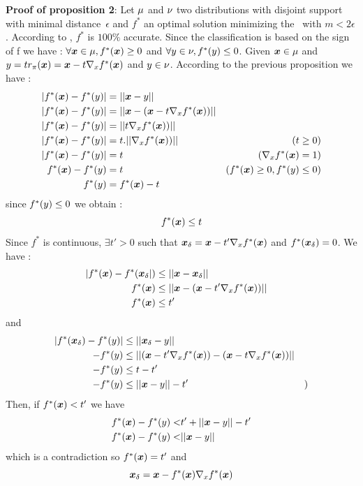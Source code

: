 \textbf{Proof of proposition 2}:
Let $\mu$ and $\nu$ two distributions with disjoint support with minimal distance~$\epsilon$ and  $f^*$ an optimal solution minimizing the \losshkr~with $m<2\epsilon$. According to \cite{serrurier2021achieving}, $f^*$ is $100\%$ accurate. Since the classification is based on the sign of f we have : $\forall \bm{x} \in \mu, f^*(\bm{x}) \geq 0$ and $\forall y \in \nu, f^*(y) \leq 0$. Given $\bm{x} \in \mu$ and $y = tr_\pi(\bm{x}) = \bm{x}  -t \nabla_x f^*(\bm{x})$  and $y \in  \nu$. According to the previous proposition we have :
\begin{align*}
  |f^*(\bm{x}) - f^*(y)| & =||\bm{x} -y || & \\
 |f^*(\bm{x}) - f^*(y)| & =||\bm{x} -(\bm{x}  -t \nabla_x f^*(\bm{x}) ) || &\\
 |f^*(\bm{x}) - f^*(y)| & =||t \nabla_x f^*(\bm{x}) ) || &\\
 |f^*(\bm{x}) - f^*(y)| & =t.|| \nabla_x f^*(\bm{x}) ) || & (t\geq 0)\\
 |f^*(\bm{x}) - f^*(y)| & =t & (\nabla_x f^*(\bm{x}) = 1)\\
 f^*(\bm{x}) - f^*(y) & =t & (f^*(\bm{x}) \geq 0,f^*(y) \leq 0) \\
 f^*(y) & =f^*(\bm{x}) - t & 
\end{align*}
since $f^*(y)\leq 0$ we obtain :
$$f^*(\bm{x}) \leq t $$
Since $f^*$ is continuous, $\exists t'>0$ such that $ \bm{x}_\delta = \bm{x}  -t' \nabla_x f^*(\bm{x}) $ and $f^*(\bm{x}_\delta) = 0$. We have :
\begin{align*}
|f^*(\bm{x}) - f^*(\bm{x}_\delta|) & \leq ||\bm{x} -\bm{x}_\delta || & \\
f^*(\bm{x}) &\leq||\bm{x} -(\bm{x}  -t' \nabla_x f^*(\bm{x}) ) || &\\
f^*(\bm{x}) &\leq t'&
\end{align*}
and 
\begin{align*}
|f^*(\bm{x}_\delta) - f^*(y)| & \leq ||\bm{x}_\delta -y|| & \\
-f^*(y) &\leq||(\bm{x}  -t' \nabla_x f^*(\bm{x}) )  - (\bm{x}  -t \nabla_x f^*(\bm{x}))|| &\\
-f^*(y) &\leq t-t'&\\
-f^*(y) &\leq ||\bm{x}-y ||-t'& )\\
\end{align*}
Then, if $f^*(\bm{x}) < t'$ we have
\begin{align*}
f^*(\bm{x})-f^*(y) < &t'+||\bm{x}-y ||-t' \\
f^*(\bm{x})-f^*(y) < &||\bm{x}-y || \\
\end{align*}
which is a contradiction so $f^*(\bm{x}) = t'$ and
$$\bm{x}_\delta = \bm{x}  -f^*(\bm{x}) \nabla_x f^*(\bm{x}) $$
\BlackBox
